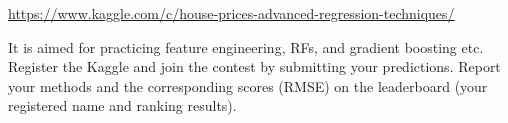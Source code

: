 \documentclass[11pt]{article}
\begin{document}
\url{https://www.kaggle.com/c/house-prices-advanced-regression-techniques/}

It is aimed for practicing feature engineering, RFs, and gradient boosting etc. Register the Kaggle and join the contest by submitting your predictions. Report your methods and the corresponding scores (RMSE) on the leaderboard (your registered name and ranking results).



%
%

%
%
\end{document}
